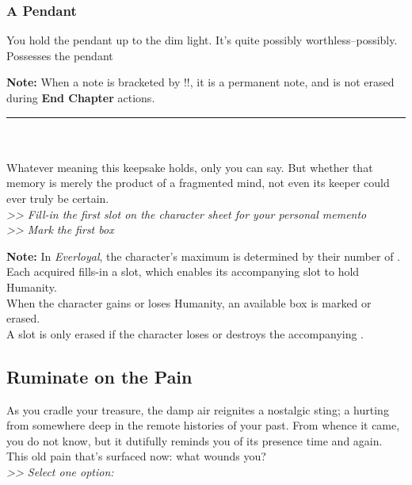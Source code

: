 \begin{multicols}{2}
\subsubsection*{A Pendant}
You hold the pendant up to the dim light. It’s quite possibly worthless--possibly.\\
 Possesses the pendant
\begin{tcolorbox}
\textbf{Note:} When a note is bracketed by !!, it is a permanent note, and is not erased during \textbf{End Chapter} actions.
\end{tcolorbox}
\end{multicols}
\hrule
\ \\
\ \\
Whatever meaning this keepsake holds, only you can say. But whether that memory is merely the product of a fragmented mind, not even its keeper could ever truly be certain.\\
\emph{>> Fill-in the first  slot on the character sheet for your personal memento\\
>> Mark the first  box}
\begin{tcolorbox}
\textbf{Note:} In \emph{Everloyal}, the character’s maximum  is determined by their number of . Each acquired  fills-in a  slot, which enables its accompanying  slot to hold Humanity.\\
When the character gains or loses Humanity, an available  box is marked or erased.\\
A  slot is only erased if the character loses or destroys the accompanying .
\end{tcolorbox}

\subsection*{Ruminate on the Pain}
As you cradle your treasure, the damp air reignites a nostalgic sting; a hurting from somewhere deep in the remote histories of your past. From whence it came, you do not know, but it dutifully reminds you of its presence time and again. This old pain that’s surfaced now: what wounds you?\\
\emph{>> Select one option:}

